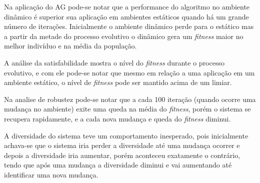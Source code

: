 Na aplicação do AG pode-se notar que a performance do algoritmo no ambiente dinâmico é superior sua aplicação em ambientes estáticos quando há um grande número de iterações. Inicialmente o ambiente dinâmico perde para o estático mas a partir da metade do processo evolutivo o dinâmico gera um \textit{fitness} maior no melhor indivíduo e na média da população.

A análise da satisfabilidade mostra o nível do \textit{fitness} durante o processo evolutivo, e com ele pode-se notar que mesmo em relação a uma aplicação em um ambiente estático, o nível de \textit{fitness} pode ser mantido acima de um limiar.

Na analise de robustez pode-se notar que a cada 100 iteração (quando ocorre uma mudança no ambiente) exite uma queda na média do \textit{fitness}, porém o sistema se recupera rapidamente, e a cada nova mudança e queda do \textit{fitness} diminui.

A diversidade do sistema teve um comportamento inesperado, pois inicialmente achava-se que o sistema iria perder a diversidade até uma mudança ocorrer e depois a diversidade iria aumentar, porém aconteceu exatamente o contrário, tendo que após uma mudança a diversidade diminui e vai aumentando até identificar uma nova mudança.